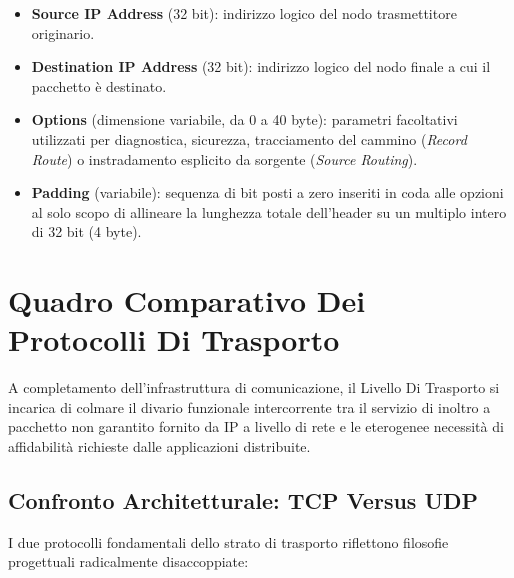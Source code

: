 \documentclass[11pt, a4paper]{article}
\begin{document}
\begin{itemize}
    \item \textbf{Source IP Address} (32 bit): indirizzo logico del nodo trasmettitore originario.
    \item \textbf{Destination IP Address} (32 bit): indirizzo logico del nodo finale a cui il pacchetto è destinato.
    \item \textbf{Options} (dimensione variabile, da 0 a 40 byte): parametri facoltativi utilizzati per diagnostica, sicurezza, tracciamento del cammino (\emph{Record Route}) o instradamento esplicito da sorgente (\emph{Source Routing}).
    \item \textbf{Padding} (variabile): sequenza di bit posti a zero inseriti in coda alle opzioni al solo scopo di allineare la lunghezza totale dell'header su un multiplo intero di 32 bit (4 byte).
\end{itemize}

\newpage

\section{Quadro Comparativo Dei Protocolli Di Trasporto}

A completamento dell'infrastruttura di comunicazione, il Livello Di Trasporto si incarica di colmare il divario funzionale intercorrente tra il servizio di inoltro a pacchetto non garantito fornito da IP a livello di rete e le eterogenee necessità di affidabilità richieste dalle applicazioni distribuite.


\subsection{Confronto Architetturale: TCP Versus UDP}

I due protocolli fondamentali dello strato di trasporto riflettono filosofie progettuali radicalmente disaccoppiate:
\end{document}
